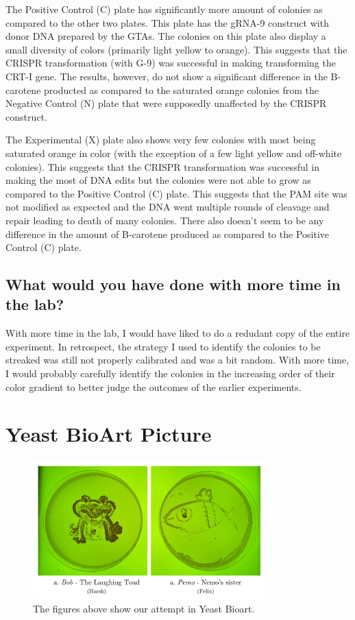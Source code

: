 \documentclass[12pt,a4paper]{article}
\begin{document}
The Positive Control (C) plate has significantly more amount of colonies as
compared to the other two plates. This plate has the gRNA-9 construct with
donor DNA prepared by the GTAs. The colonies on this plate also display a small
diversity of colors (primarily light yellow to orange). This suggests that the
CRISPR transformation (with G-9) was successful in making transforming the
CRT-I gene. The results, however, do not show a significant difference in the
B-carotene producted as compared to the saturated orange colonies from the
Negative Control (N) plate that were supposedly unaffected by the CRISPR
construct.

The Experimental (X) plate also shows very few colonies with most being
saturated orange in color (with the exception of a few light yellow and
off-white colonies). This suggests that the CRISPR transformation was
successful in making the most of DNA edits but the colonies were not able to
grow as compared to the Positive Control (C) plate. This suggests that the PAM
site was not modified as expected and the DNA went multiple rounds of cleavage
and repair leading to death of many colonies. There also doesn't seem to be any
difference in the amount of B-carotene produced as compared to the Positive
Control (C) plate.

\subsection{What would you have done with more time in the lab?}
With more time in the lab, I would have liked to do a redudant copy of the
entire experiment. In retrospect, the strategy I used to identify the colonies
to be streaked was still not properly calibrated and was a bit random. With
more time, I would probably carefully identify the colonies in the increasing
order of their color gradient to better judge the outcomes of the earlier
experiments.

\section{Yeast BioArt Picture}
\begin{figure}[h]
    \centering
    \includegraphics[width=0.8\textwidth]{figures/bioart.png}
    \caption{\centering The figures above show our attempt in Yeast Bioart.}\label{fig:bioart}
\end{figure}
\end{document}
